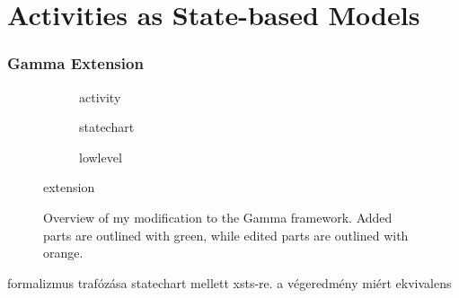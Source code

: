 \section{Activities as State-based Models}



\subsubsection{Gamma Extension}

\begin{figure}[!ht]
	\begin{subfigure}{.5\textwidth}
		\centering
		
		\caption{activity}
		\label{fig:gamma-activity-extension}
	\end{subfigure}%
	\begin{subfigure}{.5\textwidth}
		\centering
		
		\caption{statechart}
		\label{fig:gamma-statechart-extension}
	\end{subfigure}
	\begin{subfigure}{\textwidth}
		\centering
		
		\caption{lowlevel}
		\label{fig:gamma-lowlevel-extension}
	\end{subfigure}
	\caption{extension}
	\label{fig:gamma-extension}
\end{figure}

\begin{figure}[!ht]
	\centering
	
	\caption{Overview of my modification to the Gamma framework. Added parts are outlined with green, while edited parts are outlined with orange.}
	\label{fig:gamma-activity-overview}
\end{figure}

formalizmus trafózása statechart mellett xsts-re. a végeredmény miért ekvivalens